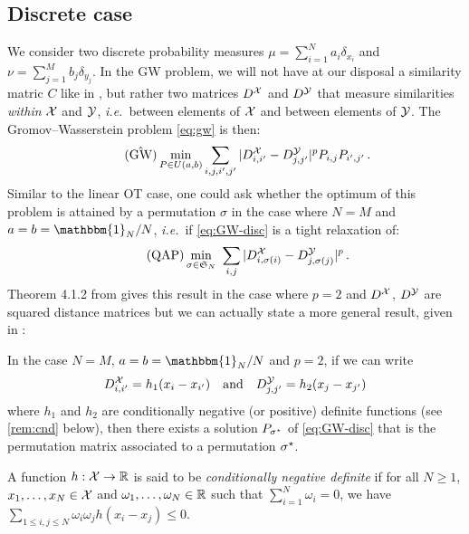         \subsection{Discrete case}
        \label{sec:discrete-gw}
        We consider two discrete probability measures $\mu=\sum_{i=1}^Na_{i}\delta_{x_{i}}$ and $\nu=\sum_{j=1}^Mb_{j}\delta_{y_{j}}$. In the GW problem, we will not have at our disposal a similarity matric $C$ like in , but rather two matrices $D^{\mathcal{X}}$ and $D^{\mathcal{Y}}$ that measure similarities \emph{within} $\mathcal{X}$ and $\mathcal{Y}$, \textit{i.e.}~between elements of $\mathcal{X}$ and between elements of $\mathcal{Y}$. The Gromov--Wasserstein problem \cref{eq:gw} is then:
        \begin{equation}
            \tag{$\hat{\text{GW}}$}
            \min_{P\in U(a,b)} \sum_{i,j,i',j'}|D^\Xx_{i,i'}-D^\Yy_{j,j'}|^pP_{i,j}P_{i',j'}\,.
            \label{eq:GW-disc}
        \end{equation}
        Similar to the linear OT case, one could ask whether the optimum of this problem is attained by a permutation $\sigma$ in the case where $N=M$ and $a=b=\mathbbm{1}_N/N$, \textit{i.e.}~if \cref{eq:GW-disc} is a tight relaxation of:
        \begin{equation}
            \tag{QAP}
            \min_{\sigma\in \mathfrak{S}_N}\ \sum_{i,j}|D^\Xx_{i,\sigma(i)}-D^\Yy_{j,\sigma(j)}|^p\,.
            \label{eq:QAP}
        \end{equation}
        Theorem 4.1.2 from \cite{vayer2020contribution} gives this result in the case where $p=2$ and $D^{\mathcal{X}}$, $D^{\mathcal{Y}}$ are squared distance matrices but we can actually state a more general result, given in \cite{maron2018probably}:
        \begin{proposition}
            \label{prop:tight-relax-gw}
            In the case $N=M$, $a=b=\mathbbm{1}_N/N$ and $p=2$, if we can write
            $$D_{i,i'}^{\mathcal{X}}=h_1(x_i-x_{i'})\quad \text{and}\quad D_{j,j'}^{\mathcal{Y}}=h_2(x_j-x_{j'})$$
            where $h_1$ and $h_2$ are conditionally negative (or positive) definite functions (see \cref{rem:cnd} below), then there exists a solution $P_{\sigma^\star}$ of \cref{eq:GW-disc} that is the permutation matrix associated to a permutation $\sigma^\star$.
        \end{proposition}
        \begin{defi}
            \label{rem:cnd}
            A function $h:\mathcal{X}\to\mathbb{R}$ is said to be \emph{conditionally negative definite} if for all $N\geq 1$, $x_1,\ldots,x_N \in \mathcal{X}$ and $\omega_1,\ldots,\omega_N \in \mathbb{R}$ such that $\sum_{i=1}^N \omega_i = 0$, we have $\sum_{1\leq i,j\leq N}\omega_i\omega_j h(x_i-x_j) \leq 0$.
        \end{defi}
